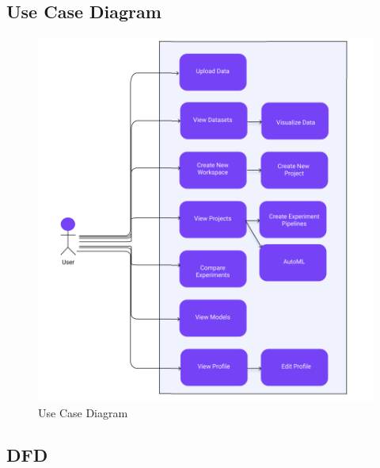 \documentclass[12pt,a4paper]{report}     %
\begin{document}
\begin{normalsize}
{{{\subsection{Use Case Diagram}
\begin{figure}[H]
    \centering
    \includegraphics[scale=0.9]{diagrams/Use_case_diagram.png}
        \caption{Use Case Diagram}
    \label{}
\end{figure}
\subsection{DFD}
}}}
\end{normalsize}
\end{document}
